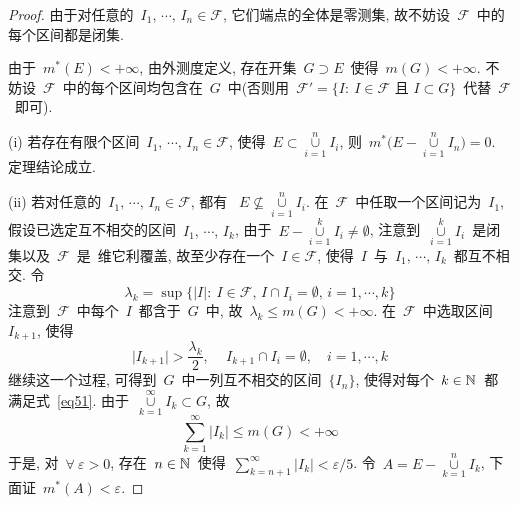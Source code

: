 \begin{proof}
由于对任意的~$I_1,\,\cdots,\,I_n \in \mathcal{F}$, 它们端点的全体是零测集, 故不妨设~$\mathcal{F}$~中的每个区间都是闭集.

由于~$m^*(E) < +\infty$, 由外测度定义, 存在开集~$G \supset E$~使得~$m(G) < +\infty$. 不妨设~$\mathcal{F}$~中的每个区间均包含在~$G$~中(否则用~$\mathcal{F}'=\{I: \: I \in \mathcal{F} \mbox{~且~} I \subset G\}$~代替~$\mathcal{F}$~即可).

(i) 若存在有限个区间~$I_1,\,\cdots,\,I_n \in \mathcal{F}$, 使得~$E \subset \mathop{\cup}\limits_{i=1}^n I_i$, 则~$m^*\Big(E- \mathop{\cup}\limits_{i=1}^n I_n \Big) = 0$. 定理结论成立.

(ii) 若对任意的~$I_1,\,\cdots,\,I_n \in \mathcal{F}$, 都有
~$E \nsubseteq \mathop{\cup}\limits_{i=1}^n I_i$. 在~$\mathcal{F}$~中任取一个区间记为~$I_1$, 假设已选定互不相交的区间~$I_1,\,\cdots,\,I_k$, 由于~$E - \mathop{\cup}\limits_{i=1}^k I_i \neq \emptyset$, 注意到~$\mathop{\cup}\limits_{i=1}^k I_i$~是闭集以及~$\mathcal{F}$~是~维它利覆盖, 故至少存在一个~$I \in \mathcal{F}$, 使得~$I$~与~$I_1,\,\cdots,\,I_k$~都互不相交. 令
\[
\lambda_k = \sup\big\{ |I|: \: I \in \mathcal{F}, \, I \cap I_i = \emptyset, \, i=1,\cdots,k \big\}
\]
注意到~$\mathcal{F}$~中每个~$I$~都含于~$G$~中, 故~$\lambda_k \leqslant m(G) < +\infty$. 在~$\mathcal{F}$~中选取区间~$I_{k+1}$, 使得
\begin{equation} \label{eq51}
\big| I_{k+1} \big| > \frac{\lambda_k}{2}, \, \quad I_{k+1} \cap I_i = \emptyset, \quad i = 1,\cdots,k
\end{equation}
继续这一个过程, 可得到~$G$~中一列互不相交的区间~$\{I_n\}$, 使得对每个~$k \in \mathbb{N}$~都满足式~\eqref{eq51}. 由于~$\mathop{\cup}\limits_{k=1}^\infty I_k \subset G$, 故
\begin{equation} \label{eq52}
\sum_{k=1}^\infty \big|I_k\big| \leqslant m(G) < +\infty
\end{equation}
于是, 对~$\forall~\varepsilon > 0$, 存在~$n \in \mathbb{N}$~使得~$\sum\limits_{k=n+1}^\infty \big|I_k\big| < \varepsilon/5$. 令~$A = E - \mathop{\cup}\limits_{k=1}^n I_k$, 下面证~$m^*(A) < \varepsilon$.


\end{proof}
